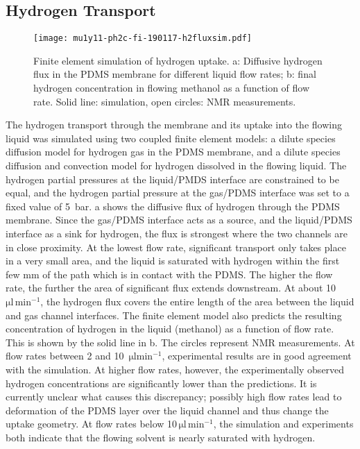 \subsection{Hydrogen Transport}

\begin{figure}
  \begin{center}
	\texttt{[image: mu1y11-ph2c-fi-190117-h2fluxsim.pdf]}
  \end{center}
	\caption{
		Finite element simulation of hydrogen uptake. a: Diffusive hydrogen
		flux in the PDMS membrane for different liquid flow rates;
		b: final hydrogen concentration in flowing methanol as a function of
		flow rate. Solid line: simulation, open circles: NMR measurements.
	}
	\label{fig:h2fluxsim}
\end{figure}

The hydrogen transport through the membrane and its uptake into the flowing
liquid was simulated using two coupled finite element models: a dilute species
diffusion model for hydrogen gas in the PDMS membrane, and a dilute species
diffusion and convection model for hydrogen dissolved in the flowing liquid. The
hydrogen partial pressures at the liquid/PMDS interface are constrained to be
equal, and the hydrogen partial pressure at the gas/PDMS interface was set to a
fixed value of 5~bar. a shows the diffusive flux of hydrogen
through the PDMS membrane.  Since the gas/PDMS interface acts as a source, and
the liquid/PDMS interface as a sink for hydrogen, the flux is strongest where
the two channels are in close proximity. At the lowest flow rate, significant
transport only takes place in a very small area, and the liquid is saturated
with hydrogen within the first few mm of the path which is in contact with the
PDMS. The higher the flow rate, the further the area of significant flux extends
downstream. At about 10~$\mathrm{\mu l \,min^{-1}}$, the hydrogen flux covers
the entire length of the area between the liquid and gas channel interfaces. The
finite element model also predicts the resulting concentration of hydrogen in
the liquid (methanol) as a function of flow rate. This is shown by the solid
line in  b. The circles represent NMR measurements. At
flow rates between 2 and 10~$\mathrm{\mu l min^{-1}}$, experimental results are
in good agreement with the simulation. At higher flow rates, however, the
experimentally observed hydrogen concentrations are significantly lower than the
predictions. It is currently unclear what causes this discrepancy; possibly high
flow rates lead to deformation of the PDMS layer over the liquid channel and
thus change the uptake geometry. At flow rates below 10$\,\mathrm{\mu l
\,min^{-1}}$, the simulation and experiments both indicate that the flowing
solvent is nearly saturated with hydrogen.


